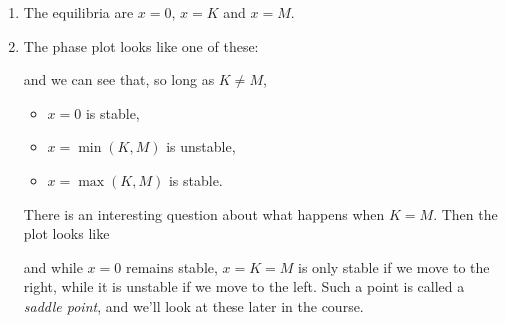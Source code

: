 \documentclass[a4paper, 12pt]{article}
\begin{document}
\begin{enumerate}[label={\bf \arabic{*}.\;}, ref={\arabic{*}},itemsep=3ex, left=0ex]
{\begin{enumerate}[label=(\alph*)]
        \item The equilibria are $x=0$, $x=K$ and $x=M$.

        \item The phase plot looks like one of these:

          \begin{center}
            \scalebox{0.95}{}
            \scalebox{0.95}{}
          \end{center}

          and we can see that, so long as $K \neq M$,
          \begin{itemize}
            \item $x=0$ is stable,
            \item $x=\min(K,M)$ is unstable,
            \item $x=\max(K,M)$ is stable.
          \end{itemize}

          There is an interesting question about what happens when $K=M$. Then the plot looks like

          \begin{center}
            
          \end{center}

          and while $x=0$ remains stable, $x=K=M$ is only stable if we move to the right, while it is unstable if we move to the left. Such a point is called a \emph{saddle point}, and we'll look at these later in the course.



\end{enumerate}}
\end{enumerate}
\end{document}
